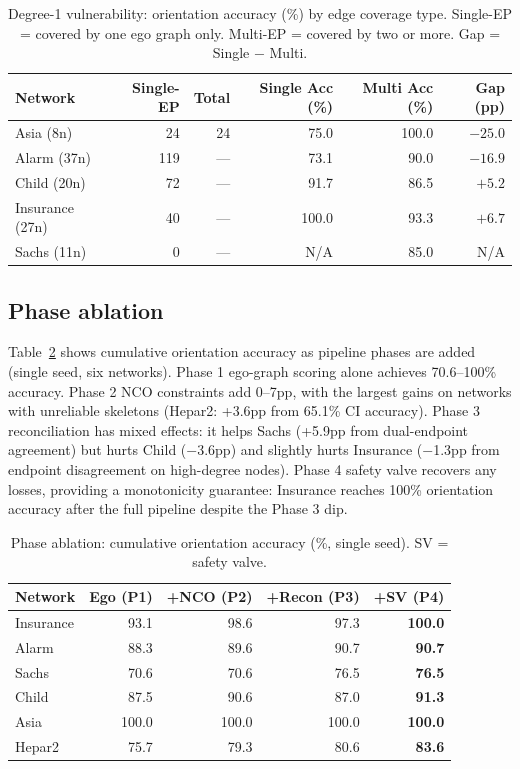 \documentclass{article}
\begin{document}
\begin{table}[t]
\centering
\caption{Degree-1 vulnerability: orientation accuracy (\%) by edge coverage type. Single-EP = covered by one ego graph only. Multi-EP = covered by two or more. Gap = Single $-$ Multi.}
\label{tab:degree1}
\small
\begin{tabular}{lrrrrr}
\toprule
Network & Single-EP & Total & Single Acc (\%) & Multi Acc (\%) & Gap (pp) \\
\midrule
Asia (8n)      & 24  & 24 & 75.0  & 100.0 & $-25.0$ \\
Alarm (37n)    & 119 & --- & 73.1  & 90.0  & $-16.9$ \\
Child (20n)    & 72  & --- & 91.7  & 86.5  & $+5.2$ \\
Insurance (27n)& 40  & --- & 100.0 & 93.3  & $+6.7$ \\
Sachs (11n)    & 0   & --- & N/A   & 85.0  & N/A \\
\bottomrule
\end{tabular}
\end{table}

\subsection{Phase ablation}

Table~\ref{tab:ablation} shows cumulative orientation accuracy as pipeline phases are added (single seed, six networks). Phase 1 ego-graph scoring alone achieves 70.6--100\% accuracy. Phase 2 NCO constraints add 0--7pp, with the largest gains on networks with unreliable skeletons (Hepar2: +3.6pp from 65.1\% CI accuracy). Phase 3 reconciliation has mixed effects: it helps Sachs (+5.9pp from dual-endpoint agreement) but hurts Child ($-$3.6pp) and slightly hurts Insurance ($-$1.3pp from endpoint disagreement on high-degree nodes). Phase 4 safety valve recovers any losses, providing a monotonicity guarantee: Insurance reaches 100\% orientation accuracy after the full pipeline despite the Phase 3 dip.

\begin{table}[t]
\centering
\caption{Phase ablation: cumulative orientation accuracy (\%, single seed). SV = safety valve.}
\label{tab:ablation}
\small
\begin{tabular}{lrrrr}
\toprule
Network & Ego (P1) & +NCO (P2) & +Recon (P3) & +SV (P4) \\
\midrule
Insurance & 93.1 & 98.6 & 97.3 & \textbf{100.0} \\
Alarm     & 88.3 & 89.6 & 90.7 & \textbf{90.7} \\
Sachs     & 70.6 & 70.6 & 76.5 & \textbf{76.5} \\
Child     & 87.5 & 90.6 & 87.0 & \textbf{91.3} \\
Asia      & 100.0 & 100.0 & 100.0 & \textbf{100.0} \\
Hepar2    & 75.7 & 79.3 & 80.6 & \textbf{83.6} \\
\bottomrule
\end{tabular}
\end{table}
\end{document}
